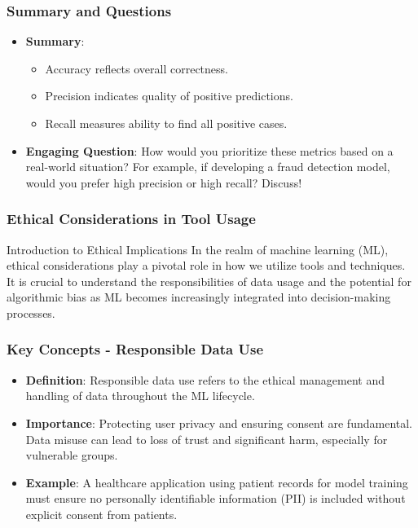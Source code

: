 \documentclass[aspectratio=169]{beamer}
\begin{document}
\begin{frame}[fragile]
    \frametitle{Summary and Questions}
    \begin{itemize}
        \item \textbf{Summary}:
        \begin{itemize}
            \item Accuracy reflects overall correctness.
            \item Precision indicates quality of positive predictions.
            \item Recall measures ability to find all positive cases.
        \end{itemize}
        \item \textbf{Engaging Question}:
        How would you prioritize these metrics based on a real-world situation? 
        For example, if developing a fraud detection model, would you prefer high precision or high recall? Discuss!
    \end{itemize}
\end{frame}

\begin{frame}[fragile]
    \frametitle{Ethical Considerations in Tool Usage}
    \begin{block}{Introduction to Ethical Implications}
        In the realm of machine learning (ML), ethical considerations play a pivotal role in how we utilize tools and techniques. It is crucial to understand the responsibilities of data usage and the potential for algorithmic bias as ML becomes increasingly integrated into decision-making processes.
    \end{block}
\end{frame}

\begin{frame}[fragile]
    \frametitle{Key Concepts - Responsible Data Use}
    \begin{itemize}
        \item \textbf{Definition}: Responsible data use refers to the ethical management and handling of data throughout the ML lifecycle.
        \item \textbf{Importance}: Protecting user privacy and ensuring consent are fundamental. Data misuse can lead to loss of trust and significant harm, especially for vulnerable groups.
        \item \textbf{Example}: A healthcare application using patient records for model training must ensure no personally identifiable information (PII) is included without explicit consent from patients.
    \end{itemize}
\end{frame}
\end{document}
